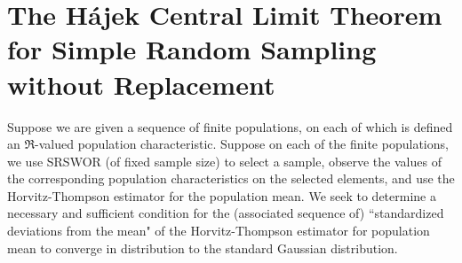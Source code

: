 

\section{The H\'ajek Central Limit Theorem for Simple Random Sampling without Replacement}
\setcounter{theorem}{0}
\setcounter{equation}{0}

Suppose we are given a sequence of finite populations, on each of which is defined an $\Re$-valued population characteristic.
Suppose on each of the finite populations, we use SRSWOR (of fixed sample size) to select a sample, observe the values
of the corresponding population characteristics on the selected elements,
and use the Horvitz-Thompson estimator for the population mean.
We seek to determine a necessary and sufficient condition for the (associated sequence of)
``standardized deviations from the mean" of the Horvitz-Thompson estimator for population mean
to converge in distribution to the standard Gaussian distribution.

\renewcommand{\theenumi}{\alph{enumi}}
\renewcommand{\labelenumi}{\textnormal{(\theenumi)}$\;\;$}

